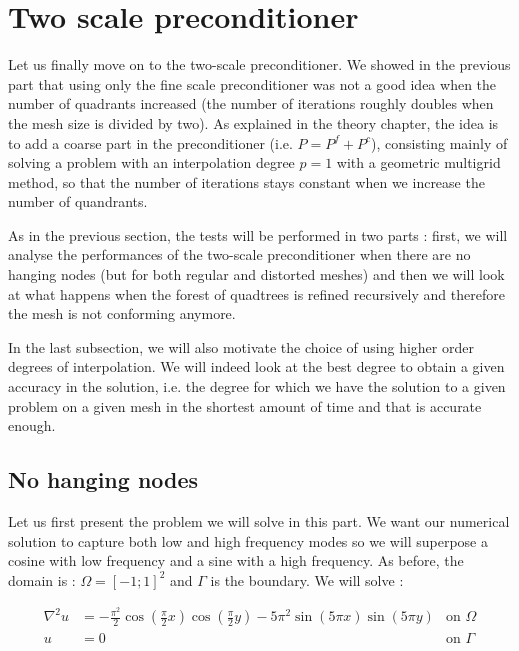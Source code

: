 \section{Two scale preconditioner}

Let us finally move on to the two-scale preconditioner. We showed in the previous part that using only the fine scale preconditioner was not a good idea when the number of quadrants increased (the number of iterations roughly doubles when the mesh size is divided by two). As explained in the theory chapter, the idea is to add a coarse part in the preconditioner (i.e. $P = P^f + P^c$), consisting mainly of solving a problem with an interpolation degree $p=1$ with a geometric multigrid method, so that the number of iterations stays constant when we increase the number of quandrants.  

As in the previous section, the tests will be performed in two parts : first, we will analyse the performances of the two-scale preconditioner when there are no hanging nodes (but for both regular and distorted meshes) and then we will look at what happens when the forest of quadtrees is refined recursively and therefore the mesh is not conforming anymore. 

In the last subsection, we will also motivate the choice of using higher order degrees of interpolation. We will indeed look at the best degree to obtain a given accuracy in the solution, i.e. the degree for which we have the solution to a given problem on a given mesh in the shortest amount of time and that is accurate enough. 

\subsection{No hanging nodes}

Let us first present the problem we will solve in this part. We want our numerical solution to capture both low and high frequency modes so we will superpose a cosine with low frequency and a sine with a high frequency. As before, the domain is : $\Omega = \left[ -1;1 \right]^2$ and $\Gamma$ is the boundary. We will solve : 

\begin{align}
\nabla^2 u &= -\frac{\pi^2}{2}\cos(\frac{\pi}{2}x)\cos(\frac{\pi}{2}y) - 5\pi^2\sin(5\pi x)\sin(5\pi y) &\text{on $\Omega$} \label{eq:prob_two}\\
u &= 0  &\text{on $\Gamma$}
\end{align}


